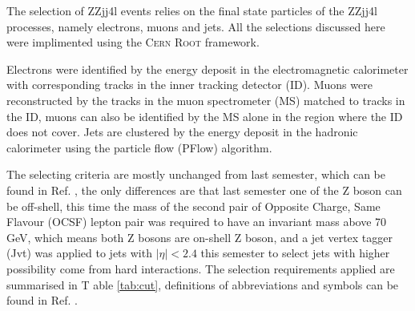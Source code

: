 \documentclass[a4paper,12pt]{article}
\begin{document}
			\par The selection of ZZjj4l events relies on the final state particles of the ZZjj4l processes, 
			namely electrons, muons and jets. All the selections discussed here were implimented using the \textsc{Cern Root} framework\cite{ANTCHEVA20092499}.
			\par Electrons were identified by the energy deposit in the electromagnetic calorimeter with corresponding 
			tracks in the inner tracking detector (ID). Muons were reconstructed by the tracks in the muon spectrometer (MS)
			matched to tracks in the ID, muons can also be identified by the MS alone in the region where the ID does not cover.
			Jets are clustered by the energy deposit in the hadronic calorimeter using the particle flow (PFlow)\cite{Aaboud_2017} 
			algorithm.

			\par The selecting criteria are mostly unchanged from last semester,
			which can be found in Ref. \cite{last:2020}, the only differences are that last semester one of the 
			Z boson can be off-shell, this time the mass of the second pair of Opposite Charge, Same Flavour (OCSF) lepton 
			pair was required to have an invariant mass above 70 GeV, which means both Z bosons are on-shell Z boson, and a 
			jet vertex tagger (Jvt)\cite{Kehinde_2017} was applied to jets with $|\eta| < 2.4$ this semester to select jets 
			with higher possibility come from hard interactions. The selection requirements applied are summarised in T
			able \ref{tab:cut}, definitions of abbreviations and symbols can be found in Ref. \cite{last:2020}.
			
\end{document}

